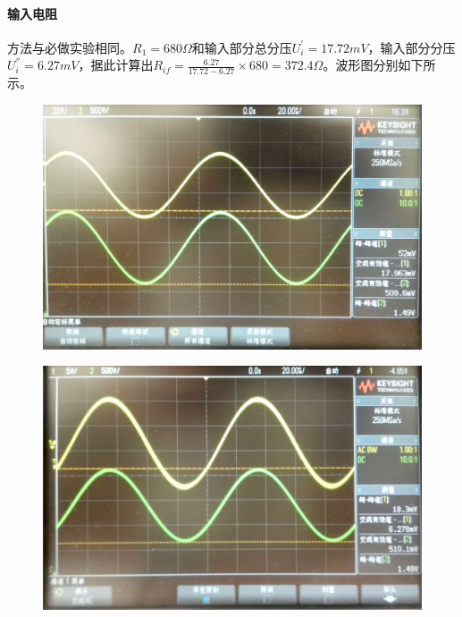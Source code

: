 \documentclass[12pt,a4paper]{article}
\begin{document}
\begin{spacing}{1.3}
\paragraph{输入电阻} 方法与必做实验相同。$R_1=680\Omega$和输入部分总分压$U_{i}^{'}=17.72mV$，输入部分分压$U_{i}^{''}=6.27mV$，据此计算出$R_{if}=\frac{6.27}{17.72-6.27}\times 680 = 372.4\Omega$。波形图分别如下所示。
\begin{figure}[H]
\centering
\includegraphics[width=\textwidth]{pic2.jpg}
\end{figure}
\begin{figure}[H]
\centering
\includegraphics[width=\textwidth]{pic3.jpg}
\end{figure}

\end{spacing}
\end{document}
